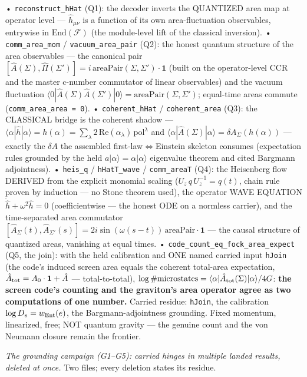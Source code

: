 \documentclass[11pt,a4paper]{article}
\begin{document}
  • \texttt{reconstruct\_hHat} (Q1): the decoder inverts the QUANTIZED area map at operator level — $\hat h_{\mu\nu}$ is a function of its own area-fluctuation observables, entrywise in $\mathrm{End}(\mathcal{F})$ (the module-level lift of the classical inversion).
  • \texttt{comm\_area\_mom} / \texttt{vacuum\_area\_pair} (Q2): the honest quantum structure of the area observables — the canonical pair $[\hat A(\Sigma),\hat\Pi(\Sigma')]=i\,\mathrm{areaPair}(\Sigma,\Sigma')\cdot\mathbf{1}$ (built on the operator-level CCR and the master c-number commutator of linear observables) and the vacuum fluctuation $\langle 0|\hat A(\Sigma)\hat A(\Sigma')|0\rangle=\mathrm{areaPair}(\Sigma,\Sigma')$; equal-time areas commute (\texttt{comm\_area\_area = 0}).
  • \texttt{coherent\_hHat} / \texttt{coherent\_area} (Q3): the CLASSICAL bridge is the coherent shadow — $\langle\alpha|\hat h|\alpha\rangle = h(\alpha) = \sum_\lambda 2\,\mathrm{Re}(\alpha_\lambda)\,\mathrm{pol}^\lambda$ and $\langle\alpha|\hat A(\Sigma)|\alpha\rangle = \delta A_\Sigma(h(\alpha))$ — exactly the $\delta A$ the assembled first-law$\Leftrightarrow$Einstein skeleton consumes (expectation rules grounded by the held $a|\alpha\rangle=\alpha|\alpha\rangle$ eigenvalue theorem and cited Bargmann adjointness).
  • \texttt{heis\_q} / \texttt{hHatT\_wave} / \texttt{comm\_areaT} (Q4): the Heisenberg flow DERIVED from the explicit monomial scaling ($U_z\,q\,U_z^{-1}=q(t)$, chain rule proven by induction — no Stone theorem used), the operator WAVE EQUATION $\ddot{\hat h}+\omega^2\hat h=0$ (coefficientwise — the honest ODE on a normless carrier), and the time-separated area commutator $[\hat A_\Sigma(t),\hat A_{\Sigma'}(s)]=2i\sin(\omega(s{-}t))\,\mathrm{areaPair}\cdot\mathbf{1}$ — the causal structure of quantized areas, vanishing at equal times.
  • \texttt{code\_count\_eq\_fock\_area\_expect} (Q5, the join): with the held calibration and ONE named carried input \texttt{hJoin} (the code's induced screen area equals the coherent total-area expectation, $\hat A_{\rm tot}=A_0\cdot\mathbf{1}+\hat A$ — total-to-total), $\log\#\text{microstates} = \langle\alpha|\hat A_{\rm tot}(\Sigma)|\alpha\rangle/4G$: \textbf{the screen code's counting and the graviton's area operator agree as two computations of one number.} Carried residue: \texttt{hJoin}, the calibration $\log D_e = w_{\rm Ent}(e)$, the Bargmann-adjointness grounding. Fixed momentum, linearized, free; NOT quantum gravity — the genuine count and the von Neumann closure remain the frontier.

\emph{The grounding campaign (G1--G5): carried hinges in multiple landed results, deleted at once.} Two files; every deletion states its residue.
\end{document}
